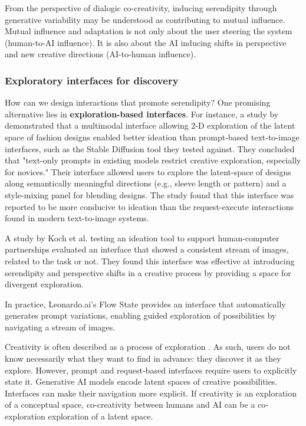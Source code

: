 From the perspective of dialogic co-creativity, inducing serendipity through generative variability may be understood as contributing to mutual influence. Mutual influence and adaptation is not only about the user steering the system (human-to-AI influence). It is also about the AI inducing shifts in perspective and new creative directions (AI-to-human influence). 

\subsubsection{Exploratory interfaces for discovery}

How can we design interactions that promote serendipity? One promising alternative lies in \textbf{exploration-based interfaces}. For instance, a study by \cite{Davis2024-ml} demonstrated that a multimodal interface allowing 2-D exploration of the latent space of fashion designs enabled better ideation than prompt-based text-to-image interfaces, such as the Stable Diffusion tool they tested against. They concluded that "text-only prompts in existing models restrict creative exploration, especially for novices." Their interface allowed users to explore the latent-space of designs along semantically meaningful directions (e.g., sleeve length or pattern) and a style-mixing panel for blending designs. The study found that this interface was reported to be more conducive to ideation than the request-execute interactions found in modern text-to-image systems. 

A study by Koch et al. \cite{Koch2020-gx} testing an ideation tool to support human-computer partnerships evaluated an interface that showed a consistent stream of images, related to the task or not. They found this interface was effective at introducing serendipity and perspective shifts in a creative process by providing a space for divergent exploration.

In practice, Leonardo.ai's Flow State provides an interface that automatically generates prompt variations, enabling guided exploration of possibilities by navigating a stream of images. 

Creativity is often described as a process of exploration \cite{Boden1998-yn, Wiggins2019-yj}. As such, users do not know necessarily what they want to find in advance: they discover it as they explore. However, prompt and request-based interfaces require users to explicitly state it. Generative AI models encode latent spaces of creative possibilities. Interfaces can make their navigation more explicit. If creativity is an exploration of a conceptual space, co-creativity between humans and AI can be a co-exploration exploration of a latent space.  

